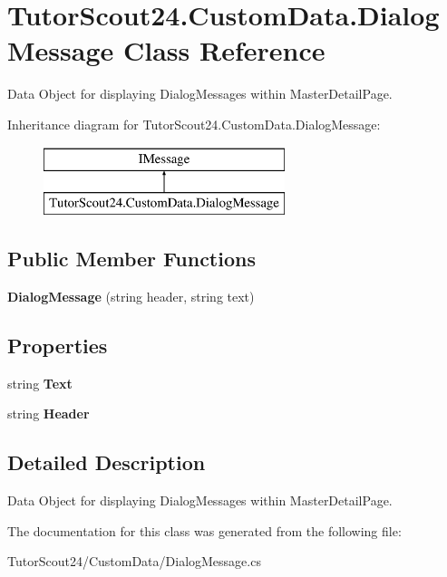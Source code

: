 \hypertarget{class_tutor_scout24_1_1_custom_data_1_1_dialog_message}{}\section{Tutor\+Scout24.\+Custom\+Data.\+Dialog\+Message Class Reference}
\label{class_tutor_scout24_1_1_custom_data_1_1_dialog_message}


Data Object for displaying Dialog\+Messages within Master\+Detail\+Page.  


Inheritance diagram for Tutor\+Scout24.\+Custom\+Data.\+Dialog\+Message\+:\begin{figure}[H]
\begin{center}
\leavevmode
\includegraphics[height=2.000000cm]{class_tutor_scout24_1_1_custom_data_1_1_dialog_message}
\end{center}
\end{figure}
\subsection*{Public Member Functions}
\begin{DoxyCompactItemize}
\item 
\mbox{\label{class_tutor_scout24_1_1_custom_data_1_1_dialog_message_a9d493e301408bffad6630bcc61f95fb1}} 
{\bfseries Dialog\+Message} (string header, string text)
\end{DoxyCompactItemize}
\subsection*{Properties}
\begin{DoxyCompactItemize}
\item 
\mbox{\label{class_tutor_scout24_1_1_custom_data_1_1_dialog_message_a6d9f238b66d53719a73721309d94edc8}} 
string {\bfseries Text}
\item 
\mbox{\label{class_tutor_scout24_1_1_custom_data_1_1_dialog_message_a1232fc6690f3efd663efb6919783d38f}} 
string {\bfseries Header}
\end{DoxyCompactItemize}


\subsection{Detailed Description}
Data Object for displaying Dialog\+Messages within Master\+Detail\+Page. 



The documentation for this class was generated from the following file\+:\begin{DoxyCompactItemize}
\item 
Tutor\+Scout24/\+Custom\+Data/Dialog\+Message.\+cs\end{DoxyCompactItemize}
